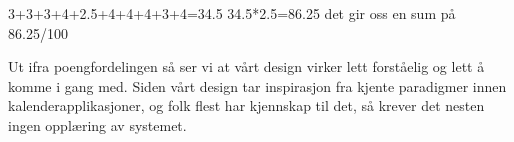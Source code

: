 3+3+3+4+2.5+4+4+4+3+4=34.5
34.5*2.5=86.25
det gir oss en sum på 86.25/100

Ut ifra poengfordelingen så ser vi at vårt design virker lett forståelig og lett å komme i gang med. Siden vårt design tar inspirasjon fra kjente paradigmer innen kalenderapplikasjoner, og folk flest har kjennskap til det, så krever det nesten ingen opplæring av systemet.